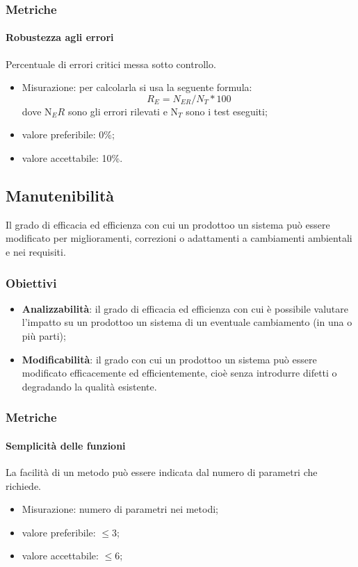         \subsubsection{Metriche}
            \paragraph{Robustezza agli errori}
                Percentuale di errori critici messa sotto controllo.
                \begin{itemize}
                    \item Misurazione: per calcolarla si usa la seguente formula:
                    \[R_E=N_{ER}/N_{T}*100\]
                    dove N$_ER$ sono gli errori rilevati e N$_T$ sono i test eseguiti;
                    \item valore preferibile: 0\%;
                    \item valore accettabile: 10\%.
                \end{itemize}
    \subsection{Manutenibilità}
        Il grado di efficacia ed efficienza con cui un prodotto\glosp o un sistema può essere modificato per miglioramenti, correzioni o adattamenti a cambiamenti ambientali e nei requisiti.
        \subsubsection{Obiettivi}
        \begin{itemize}
            \item \textbf{Analizzabilità}: il grado di efficacia ed efficienza con cui è possibile valutare l'impatto su un prodotto\glosp o un sistema di un eventuale cambiamento (in una o più parti);
            \item \textbf{Modificabilità}: il grado con cui un prodotto\glosp o un sistema può essere modificato efficacemente ed efficientemente, cioè senza introdurre difetti o degradando la qualità esistente.
        \end{itemize}
        \subsubsection{Metriche}
            \paragraph{Semplicità delle funzioni}
                La facilità di un metodo può essere indicata dal numero di parametri che richiede.
                \begin{itemize}
                    \item Misurazione: numero di parametri nei metodi;
                    \item valore preferibile: $\leq 3$;
                    \item valore accettabile: $\leq 6$;
                \end{itemize}
